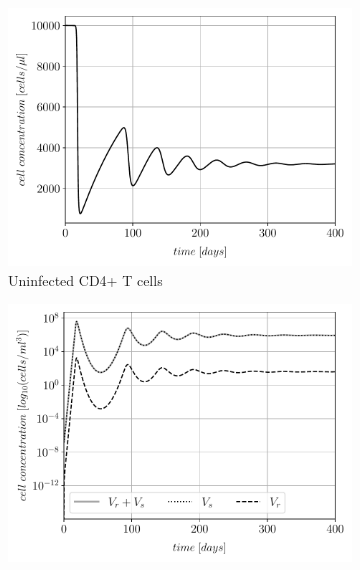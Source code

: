 \begin{figure}
    \centering
    \begin{subfigure}[b]{0.475\textwidth}
        \centering
        \includegraphics[width=\textwidth]{images/eRT_0_alpha_0/untreated_T.pdf}
        \caption[]%
        {{\small Uninfected CD4+ T cells}}    
        \label{fig1a:uninfected_T_cells}
    \end{subfigure}
    \begin{subfigure}[b]{0.475\textwidth}   
        \centering 
        \includegraphics[width=\textwidth]{images/eRT_0_alpha_0/untreated_overview_V.pdf}

\end{subfigure}
\end{figure}
